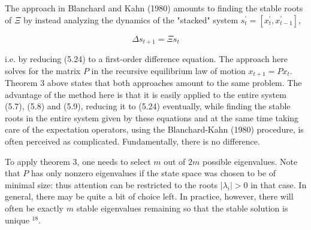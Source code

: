 \documentclass[10pt]{article}
\begin{document}
The approach in Blanchard and Kahn (1980) amounts to finding the stable roots of $\Xi$ by instead analyzing the dynamics of the "stacked" system $s_{t}^{\prime}=\left[x_{t}^{\prime}, x_{t-1}^{\prime}\right]$,

\begin{equation*}
\Delta s_{t+1}=\Xi s_{t}
\end{equation*}

i.e. by reducing (5.24) to a first-order difference equation. The approach here solves for the matrix $P$ in the recursive equilibrium law of motion $x_{t+1}=P x_{t}$. Theorem 3 above states that both approaches amount to the same problem. The advantage of the method here is that it is easily applied to the entire system (5.7), (5.8) and (5.9), reducing it to (5.24) eventually, while finding the stable roots in the entire system given by these equations and at the same time taking care of the expectation operators, using the Blanchard-Kahn (1980) procedure, is often perceived as complicated. Fundamentally, there is no difference.

To apply theorem 3, one needs to select $m$ out of $2 m$ possible eigenvalues. Note that $P$ has only nonzero eigenvalues if the state space was chosen to be of minimal size: thus attention can be restricted to the roots $\left|\lambda_{i}\right|>0$ in that case. In general, there may be quite a bit of choice left. In practice, however, there will often be exactly $m$ stable eigenvalues remaining so that the stable solution is unique ${ }^{18}$.
\end{document}
